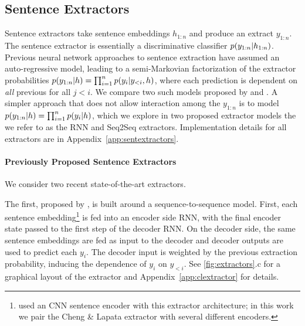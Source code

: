 \subsection{Sentence Extractors} \label{sec:sext}



Sentence extractors take sentence embeddings $h_{1:n}$ and produce an extract $y_{1:n}$.
The sentence extractor is essentially a discriminative 
classifier $p(\slabel_{1:n} | \sentEmb_{1:n})$.
Previous neural network approaches to sentence extraction have assumed 
an auto-regressive model, leading to a semi-Markovian
factorization of the extractor probabilities 
$p(\slabel_{1:n}|\sentEmb)=\prod_{i=1}^\docSize 
p(\slabel[i]|\slabel[<i],\sentEmb)$,
where each prediction \slabel[i] is dependent on \emph{all} 
previous \slabel[j] for
all $j < i$. We compare two such models proposed by \citet{cheng2016neural}
and \citet{nallapati2017summarunner}.
A simpler approach that does not allow interaction among the $y_{1:n}$
is to 
  model $p(\slabel_{1:n}|\sentEmb) = \prod_{i=1}^n p(y_i|h)$, 
  which we explore in two proposed extractor models the we refer to as the RNN 
  and Seq2Seq extractors.
Implementation details for all extractors are in Appendix~\ref{app:sentextractors}.


\paragraph{Previously Proposed Sentence Extractors}
 We consider two recent state-of-the-art extractors.

 The first, proposed by 
\citet{cheng2016neural}, %
is built around a sequence-to-sequence model.
First, each sentence embedding\footnote{\citet{cheng2016neural} used an CNN sentence encoder with 
this extractor architecture; in this work we pair the Cheng \& Lapata extractor
with several different encoders.} is
fed into an encoder side RNN, with the final encoder state passed to the
first step of the decoder RNN. On the decoder side, the same sentence 
embeddings are fed as input to the decoder and decoder outputs are used to
predict each $y_i$. The decoder input is weighted by the previous extraction
probability, inducing the dependence of $y_i$ on $y_{<i}$.
See \autoref{fig:extractors}.c for a graphical layout of the extractor
and Appendix~\ref{app:clextractor} for details.

